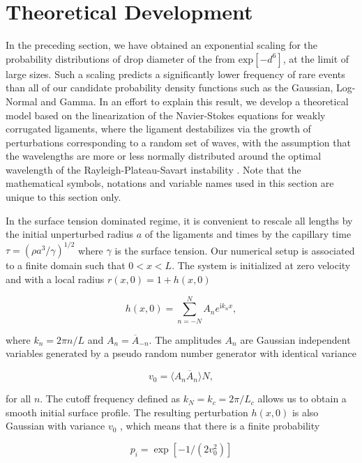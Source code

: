 \section{Theoretical Development}

\newcommand\be{\begin{equation}}
\newcommand\nd{\end{equation}}
\newcommand\ii{{\textrm{i}}}

In the preceding section, we have obtained an exponential scaling for the probability distributions
of drop diameter of the from $\textrm{exp}[-d^6]$, at the limit of large sizes. 
Such a scaling predicts a significantly lower frequency of rare events than all of our candidate 
probability density functions such as the Gaussian, Log-Normal and Gamma. 
In an effort to explain this result, we develop a theoretical model based on the 
linearization of the Navier-Stokes equations for weakly corrugated ligaments, where the ligament destabilizes 
via the growth of perturbations corresponding to a random set of waves, with the assumption
that the wavelengths are more or less normally distributed around the optimal wavelength 
of the Rayleigh-Plateau-Savart instability \cite{rayleigh1879a,plateau1849}.  Note that the mathematical symbols, notations and variable names used in this section are unique to this section only.

In the surface tension dominated regime, it is convenient to rescale all lengths by the
initial unperturbed radius $a$ of the ligaments and times by the capillary time
$\tau = (\rho a^3/\gamma)^{1/2}$ where $\gamma$ is the surface tension.
Our numerical setup is associated to a finite domain such that $0 < x < L$. 
The system is initialized at zero velocity and with a local radius $r(x,0) = 1 + h(x,0)$

\be
h(x,0) = \sum_{n=-N}^{N}  A_n e^{\ii k_n x} ,  \label{p1}
\nd

where $k_n=2\pi n / L$ and $A_n = \overline A_{-n}$. 
The amplitudes $A_n$ are Gaussian independent variables
generated by a pseudo random number generator with identical variance

\be
v_0 = \langle A_n \overline A_n \rangle N ,
\nd

for all $n$. The cutoff frequency defined as $k_N=k_c = 2\pi /L_c$ allows us to obtain a smooth
initial surface profile. The resulting perturbation $h(x,0)$ is also Gaussian with variance $v_0$ 
, which means that there is a finite probability

\be
p_i = \exp[{-1/(2 v_0^2)}] \label{p2}
\nd

